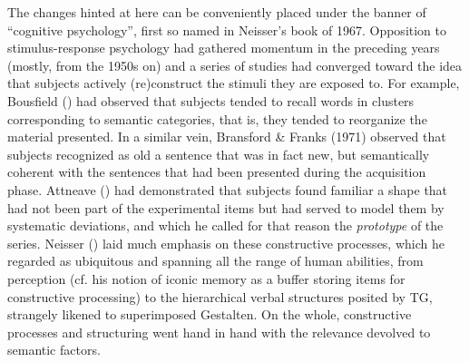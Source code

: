 \documentclass[output=paper]{langscibook}
\begin{document}
The changes hinted at here can be conveniently placed under the banner of “cognitive psychology”, first so named in Neisser’s book of 1967. Opposition to stimulus-response psychology had gathered momentum in the preceding years (mostly, from the 1950s on) and a series of studies had converged toward the idea that subjects actively (re)construct the stimuli they are exposed to. For example, Bousfield (\citeyear{bousfield_occurrence_1953}) had observed that subjects tended to recall words in clusters corresponding to semantic categories, that is, they tended to reorganize the material presented. In a similar vein, Bransford \& Franks (1971) observed that subjects recognized as old a sentence that was in fact new, but semantically coherent with the sentences that had been presented during the acquisition phase. Attneave (\citeyear{attneave_transfer_1957}) had demonstrated that subjects found familiar a shape that had not been part of the experimental items but had served to model them by systematic deviations, and which he called for that reason the \textit{prototype} of the series. Neisser (\citeyear{neisser_cognitive_1967}) laid much emphasis on these constructive processes, which he regarded as ubiquitous and spanning all the range of human abilities, from perception (cf. his notion of iconic memory as a buffer storing items for constructive processing) to the hierarchical verbal structures posited by TG, strangely likened to superimposed Gestalten. On the whole, constructive processes and structuring went hand in hand with the relevance devolved to semantic factors.
\end{document}

